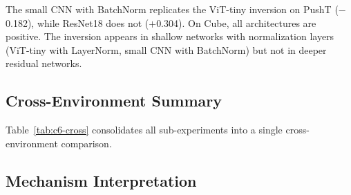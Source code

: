 The small CNN with BatchNorm replicates the ViT-tiny inversion on PushT
($-$0.182), while ResNet18 does not ($+$0.304).  On Cube, all architectures
are positive.  The inversion appears in shallow networks with normalization
layers (ViT-tiny with LayerNorm, small CNN with BatchNorm) but not in
deeper residual networks.

\subsection{Cross-Environment Summary}
\label{app:c6_summary}

Table~\ref{tab:c6-cross} consolidates all sub-experiments into a single
cross-environment comparison.

\begin{table}[h]
\centering
\caption{Full C6 audit cross-environment summary.  Each row is one
sub-experiment or baseline.  Spearman correlations measure endpoint ranking
on the respective 100-pair artifact.}
\label{tab:c6-cross}
\end{table}

\subsection{Mechanism Interpretation}

